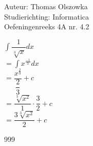 \documentclass[a4paper]{article}
\newcommand{\dint}{\displaystyle\int}
\newcommand{\thirdroot}{\sqrt[3]}
\begin{document}
\noindent \large Auteur: Thomas Olszowka \\
\noindent \large Studierichting: Informatica \\
\noindent \large Oefeningenreeks 4A nr. 4.2  \\



\medskip

\normalsize

$\dint \dfrac{1}{\thirdroot{x}} dx$ \\

$= \dint x^{\tfrac{-1}{3}} dx$ \\

$= \dfrac{x^{\tfrac{2}{3}}}{\dfrac{2}{3}} + c$ \\

$= \dfrac{\thirdroot{x^2}}{1} \cdot \dfrac{3}{2} + c$ \\

$= \dfrac{3\thirdroot{x^2}}{2} + c$ \\

\begin{thebibliography}{999}
\end{thebibliography}
\end{document}
